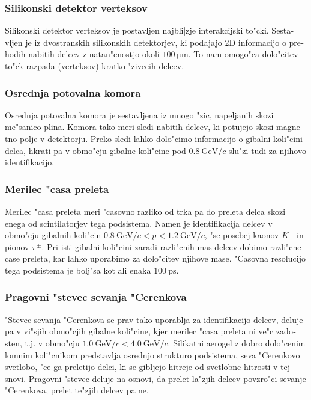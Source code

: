 \documentclass[headings=standardclasses,headings=big,oneside,a4paper,openany,12pt]{scrbook}
\newcommand {\e}[1]{\mathrm{~#1}}
\begin{document}
\begin{otherlanguage}{slovene}
\subsubsection{Silikonski  detektor verteksov}
Silikonski detektor verteksov je postavljen najbli|zje interakcijski to"cki. Sestavljen je iz dvostranskih silikonskih detektorjev, ki podajajo 2D informacijo o prehodih nabitih delcev z natan"cnostjo okoli $100\e{\mu m}$. To nam omogo"ca dolo"citev to"ck razpada (verteksov) kratko-"zivecih delcev.

\subsubsection{Osrednja potovalna komora}
Osrednja potovalna komora je sestavljena iz mnogo "zic, napeljanih skozi me"sanico plina.  Komora tako meri sledi nabitih delcev, ki potujejo skozi magnetno polje v detektorju. Preko sledi lahko dolo"cimo informacijo o gibalni koli"cini delca, hkrati pa v obmo"cju gibalne koli"cine pod $0.8\e{GeV}/c$ slu"zi tudi za njihovo identifikacijo.

\subsubsection{Merilec "casa preleta}
Merilec "casa preleta meri "casovno razliko od trka pa do preleta delca skozi enega od scintilatorjev tega podsistema. Namen je identifikacija delcev v obmo"cju gibalnih koli"cin $0.8\e{GeV}/c < p < 1.2\e{GeV}/c$, "se posebej kaonov $K^\pm$ in pionov $\pi^\pm$. Pri isti gibalni koli"cini zaradi razli"cnih mas delcev dobimo razli"cne case preleta, kar lahko uporabimo za dolo"citev njihove mase. "Casovna resolucijo tega podsistema je bolj"sa kot ali enaka $100\e{ps}$.

\subsubsection{Pragovni "stevec sevanja "Cerenkova}
"Stevec sevanja "Cerenkova se prav tako uporablja za identifikacijo delcev, deluje pa v vi"sjih obmo"cjih gibalne koli"cine, kjer merilec "casa preleta ni ve"c zadosten, t.j. v obmo"cju $1.0\e{GeV}/c < 4.0\e{GeV}/c$. Silikatni aerogel z dobro dolo"cenim lomnim koli"cnikom predstavlja osrednjo strukturo podsistema, seva "Cerenkovo svetlobo, "ce ga preletijo delci, ki se gibljejo hitreje od svetlobne hitrosti v tej snovi. Pragovni "stevec deluje na osnovi, da prelet la"zjih delcev povzro"ci sevanje "Cerenkova, prelet te"zjih delcev pa ne.


\end{otherlanguage}
\end{document}
